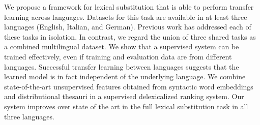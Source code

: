 We propose a framework for lexical substitution that is able to perform transfer learning across languages. Datasets for this task are available in at least three languages (English, Italian, and German). Previous work has addressed each of these tasks in isolation. In contrast, we regard the union of three shared tasks as a combined multilingual dataset. We show that a supervised system can be trained effectively, even if training and evaluation data are from different languages. Successful transfer learning between languages suggests that the learned model is in fact independent of the underlying language. We combine state-of-the-art unsupervised features obtained from syntactic word embeddings and distributional thesauri in a supervised delexicalized ranking system. Our system improves over state of the art in the full lexical substitution task in all three languages.
